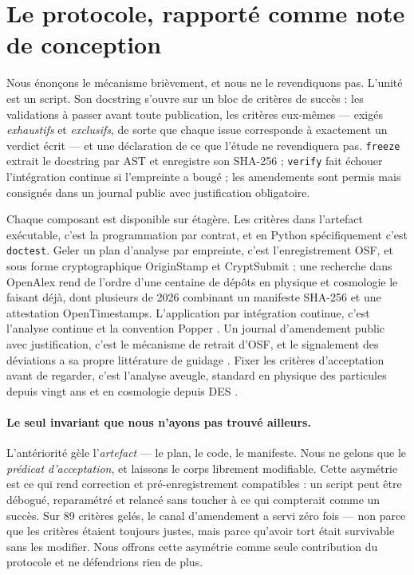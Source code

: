 \documentclass[11pt,a4paper]{article}
\begin{document}
\section{Le protocole, rapporté comme note de conception}
\label{sec:protocole}

Nous énonçons le mécanisme brièvement, et nous ne le revendiquons pas. L'unité est un script.
Son docstring s'ouvre sur un bloc de critères de succès : les validations à passer avant toute
publication, les critères eux-mêmes --- exigés \emph{exhaustifs} et \emph{exclusifs}, de sorte
que chaque issue corresponde à exactement un verdict écrit --- et une déclaration de ce que
l'étude ne revendiquera pas. \texttt{freeze} extrait le docstring par AST et enregistre son
SHA-256 ; \texttt{verify} fait échouer l'intégration continue si l'empreinte a bougé ; les
amendements sont permis mais consignés dans un journal public avec justification obligatoire.

Chaque composant est disponible sur étagère. Les critères dans l'artefact exécutable, c'est la
programmation par contrat, et en Python spécifiquement c'est \texttt{doctest}. Geler un plan
d'analyse par empreinte, c'est l'enregistrement OSF, et sous forme cryptographique OriginStamp
\citep{originstamp} et CryptSubmit \citep{cryptsubmit} ; une recherche dans OpenAlex rend de
l'ordre d'une centaine de dépôts en physique et cosmologie le faisant déjà, dont plusieurs de
2026 combinant un manifeste SHA-256 et une attestation OpenTimestamps. L'application par
intégration continue, c'est l'analyse continue \citep{bj2017} et la convention Popper
\citep{popper}. Un journal d'amendement public avec justification, c'est le mécanisme de
retrait d'OSF, et le signalement des déviations a sa propre littérature de guidage
\citep{willroth2024}. Fixer les critères d'acceptation avant de regarder, c'est l'analyse
aveugle, standard en physique des particules depuis vingt ans \citep{klein2005,maccoun2015} et
en cosmologie depuis DES \citep{muir2020}.

\paragraph{Le seul invariant que nous n'ayons pas trouvé ailleurs.} L'antériorité gèle
l'\emph{artefact} --- le plan, le code, le manifeste. Nous ne gelons que le \emph{prédicat
d'acceptation}, et laissons le corps librement modifiable. Cette asymétrie est ce qui rend
correction et pré-enregistrement compatibles : un script peut être débogué, reparamétré et
relancé sans toucher à ce qui compterait comme un succès. Sur 89 critères gelés, le canal
d'amendement a servi zéro fois --- non parce que les critères étaient toujours justes, mais
parce qu'avoir tort était survivable sans les modifier. Nous offrons cette asymétrie comme
seule contribution du protocole et ne défendrions rien de plus.
\end{document}
